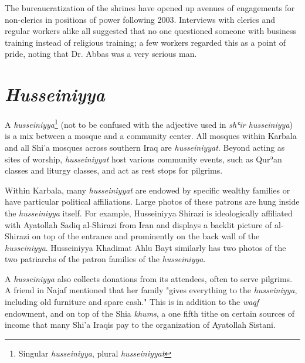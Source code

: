 The bureaucratization of the shrines have opened up avenues of engagements for non-clerics in positions of power following 2003. Interviews with clerics and regular workers alike all suggested that no one questioned someone with business training instead of religious training; a few workers regarded this as a point of pride, noting that Dr. Abbas was a very serious man. 


\section{\emph{Husseiniyya}}
A \emph{husseiniyya}\footnote{Singular \emph{husseiniyya}, plural \emph{husseiniyyat}} (not to be confused with the adjective used in \emph{shʿir husseiniyya}) is a mix between a mosque and a community center. All mosques within Karbala and all Shi'a mosques across southern Iraq are \emph{husseiniyyat}. Beyond acting as sites of worship, \emph{husseiniyyat} host various community events, such as Qurʾan classes and liturgy classes, and act as rest stops for pilgrims.

Within Karbala, many \emph{husseiniyyat} are endowed by specific wealthy families or have particular political affiliations. Large photos of these patrons are hung inside the \emph{husseiniyya} itself. For example, Husseiniyya Shirazi is ideologically affiliated with Ayatollah Sadiq al-Shirazi from Iran and displays a backlit picture of al-Shirazi on top of the entrance and prominently on the back wall of the \emph{husseiniyya}. Husseiniyya Khadimat Ahlu Bayt similarly has two photos of the two patriarchs of the patron families of the \emph{husseiniyya}.

A \emph{husseiniyya} also collects donations from its attendees, often to serve pilgrims. A friend in Najaf mentioned that her family "gives everything to the \emph{husseiniyya}, including old furniture and spare cash." This is in addition to the \emph{waqf} endowment, and on top of the Shia \emph{khums}, a one fifth tithe on certain sources of income that many Shi'a Iraqis pay to the organization of Ayatollah Sistani.

